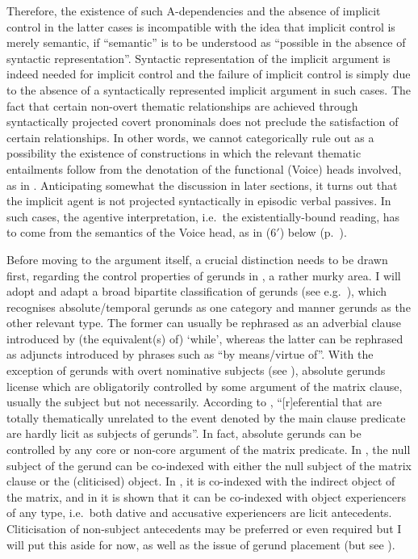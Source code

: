 \documentclass[output=paper]{langsci/langscibook}
\begin{document}
Therefore, the existence of such A-dependencies and the absence of implicit
control in the latter cases is incompatible with the idea that implicit control is merely
semantic, if \enquote{semantic} is to be understood as \enquote{possible in the
    absence of syntactic representation}. Syntactic representation of the
    implicit argument is indeed needed for implicit control and the failure of
    implicit control is simply due to the absence of a syntactically
    represented implicit argument in such cases. The fact that certain
    non-overt thematic relationships are achieved through syntactically
    projected covert pronominals does not preclude the satisfaction of certain
    relationships. In other words, we cannot categorically rule out as a
    possibility the existence of constructions in which the relevant thematic
    entailments follow from the denotation of the functional (Voice) heads
    involved, as in \textcite{SpathasEtAl2015}. Anticipating somewhat the discussion in
    later sections, it turns out that the implicit agent is not projected
    syntactically in  episodic verbal passives. In such
    cases, the agentive interpretation, i.e.\ the existentially-bound reading,
    has to come from the semantics of the Voice head, as in (6$'$) below
    (p.~\pageref{ex:key:22.6prime}).

Before moving to the argument itself, a crucial distinction needs to be drawn
first, regarding the control properties of gerunds in , a rather murky
area.  I will adopt and adapt a broad bipartite classification of  gerunds
(see e.g.\ \citealt{Tsimpli2000}), which recognises absolute/temporal gerunds as
one category and manner gerunds as the other relevant type. The former can
usually be rephrased as an adverbial clause introduced by (the equivalent(s)
of) ‘while’, whereas the latter can be rephrased as adjuncts introduced by
phrases such as “by means/virtue of”. With the exception of gerunds with overt
nominative subjects (see \citealt{Tzartzanos1946,Kotzoglou2016}),
absolute gerunds license  which are obligatorily controlled by
some argument of the matrix clause, usually the subject but not necessarily.
According to \citet{Kotzoglou2016}, “[r]eferential  that are
totally thematically unrelated to the event denoted by the main clause
predicate are hardly licit as subjects of gerunds”.  In fact, absolute gerunds
can be controlled by any core or non-core argument of the matrix predicate. In
, the null subject of the gerund can be co-indexed with either
the null subject of the matrix clause or the (cliticised) object. In
, it is co-indexed with the indirect object of the matrix, and
in  it is shown that it can be co-indexed with object
experiencers of any type, i.e.\ both dative and accusative experiencers are
licit antecedents. Cliticisation of non-subject antecedents may be preferred or
even required but I will put this aside for now, as well as the issue of gerund
placement (but see \citealt{HaidouSitaridou2002}).
\end{document}

